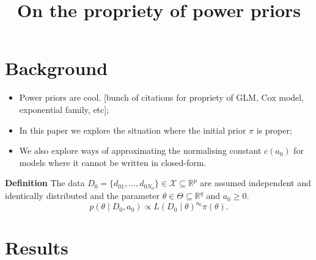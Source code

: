 \documentclass[a4paper, notitlepage, 11pt]{article}
\title{\vspace{-9ex}\centering \bf On the propriety of power priors}
\author{
}
\begin{document}
\maketitle

% 

\section{Background}

\begin{itemize}
 \item Power priors are cool. [bunch of citations for propriety of GLM, Cox model, exponential family, etc];
 \item In this paper we explore the situation where the initial prior $\pi$ is proper;
 \item We also explore ways of approximating the normalising constant $c(a_0)$ for models where it cannot be written in closed-form. 
\end{itemize}

\textbf{Definition}
The data $D_0 = \{ d_{01}, \ldots, d_{0N_0} \} \in \mathcal{X} \subseteq \mathbb{R}^p$ are assumed independent and identically distributed  and the parameter $\theta \in \Theta \subseteq \mathbb{R}^q$ and $a_0 \geq 0$.
\begin{equation}
\label{eq:power_prior}
 p(\theta \mid D_0, a_0) \propto L(D_0 \mid \theta)^{a_0}\pi(\theta).
\end{equation}

\section{Results}
\end{document}
